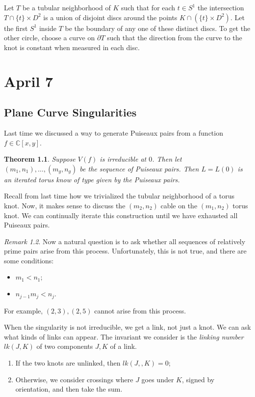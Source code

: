 \documentclass[leqno, openany]{memoir}
\newtheorem{thm}{Theorem}[chapter]
\theoremstyle{definition}
\theoremstyle{remark}
\newtheorem{rmk}[thm]{Remark}
\theoremstyle{plain}
\theoremstyle{definition}
\theoremstyle{remark}
\newcommand{\C}{\mathbb{C}}
\begin{document}
Let $T$ be a tubular neighborhood of $K$ such that for each $t \in S^1$ the intersection $T \cap \{t \} \times D^2$ is a union of disjoint discs around the points $K \cap (\{ t \} \times D^2)$. Let the first $S^1$ inside $T$ be the boundary of any one of these distinct discs. To get the other circle, choose a curve on $\partial T$ such that the direction from the curve to the knot is constant when measured in each disc.

\chapter{April 7}%
\label{cha:april_7}

\section{Plane Curve Singularities}%
\label{sec:plane_curve_singularities}

Last time we discussed a way to generate Puiseaux pairs from a function $f \in \C[x,y]$.

\begin{thm}
    Suppose $V(f)$ is irreducible at $0$. Then let $(m_1, n_1), \ldots, (m_g, n_g)$ be the sequence of Puiseaux pairs. Then $L = L(0)$ is an iterated torus know of type given by the Puiseaux pairs.
\end{thm}

Recall from last time how we trivialized the tubular neighborhood of a torus knot. Now, it makes sense to discuss the $(m_2, n_2)$ cable on the $(m_1, n_2)$ torus knot. We can continually iterate this construction until we have exhausted all Puiseaux pairs. 

\begin{rmk}
    Now a natural question is to ask whether all sequences of relatively prime pairs arise from this process. Unfortunately, this is not true, and there are some conditions:
    \begin{itemize}
        \item $m_1 < n_1$;
        \item $n_{j-1}m_j < n_j$.
    \end{itemize}
    For example, $(2,3), (2,5)$ cannot arise from this process.
\end{rmk}

When the singularity is not irreducible, we get a link, not just a knot. We can ask what kinds of links can appear. The invariant we consider is the \textit{linking number} $lk(J,K)$ of two components $J,K$ of a link.
\begin{enumerate}
    \item If the two knots are unlinked, then $lk(J,,K) = 0$;
    \item Otherwise, we consider crossings where $J$ goes under $K$, signed by orientation, and then take the sum.
\end{enumerate}
\end{document}

